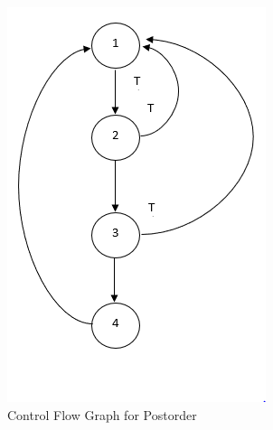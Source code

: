 \documentclass[10pt,twocolumn,hidelinks]{IEEEtran}
\begin{document}
 \begin{figure}[h]
\includegraphics[scale=0.4]{CFGPostOrderAlg11.png}
\caption{Control Flow Graph for Postorder}
\label{fig:cfgpostorder}
\end{figure}
\end{document}
